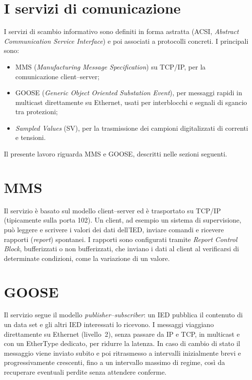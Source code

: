 \documentclass[11pt,a4paper,italian,oneside,openany]{book}
\begin{document}
\section{I servizi di comunicazione}
I servizi di scambio informativo sono definiti in forma astratta (ACSI, \textit{Abstract Communication Service Interface}) e poi associati a protocolli concreti. I principali sono:
\begin{itemize}
    \item MMS (\textit{Manufacturing Message Specification}) su TCP/IP, per la comunicazione client--server;
    \item GOOSE (\textit{Generic Object Oriented Substation Event}), per messaggi rapidi in multicast direttamente su Ethernet, usati per interblocchi e segnali di sgancio tra protezioni;
    \item \textit{Sampled Values} (SV), per la trasmissione dei campioni digitalizzati di correnti e tensioni.
\end{itemize}
Il presente lavoro riguarda MMS e GOOSE, descritti nelle sezioni seguenti.

\section{MMS}
Il servizio è basato sul modello client--server ed è trasportato su TCP/IP (tipicamente sulla porta 102). Un client, ad esempio un sistema di supervisione, può leggere e scrivere i valori dei dati dell'IED, inviare comandi e ricevere rapporti (\textit{report}) spontanei. I rapporti sono configurati tramite \textit{Report Control Block}, bufferizzati o non bufferizzati, che inviano i dati al client al verificarsi di determinate condizioni, come la variazione di un valore.

\section{GOOSE}
Il servizio segue il modello \textit{publisher--subscriber}: un IED pubblica il contenuto di un data set e gli altri IED interessati lo ricevono. I messaggi viaggiano direttamente su Ethernet (livello~2), senza passare da IP e TCP, in multicast e con un EtherType dedicato, per ridurre la latenza. In caso di cambio di stato il messaggio viene inviato subito e poi ritrasmesso a intervalli inizialmente brevi e progressivamente crescenti, fino a un intervallo massimo di regime, così da recuperare eventuali perdite senza attendere conferme.
\end{document}
